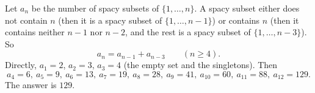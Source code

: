 Let $a_n$ be the number of spacy subsets of $\{1,\dots,n\}$. A spacy subset either does not contain $n$ (then it is a spacy subset of $\{1,\dots,n-1\}$) or contains $n$ (then it contains neither $n-1$ nor $n-2$, and the rest is a spacy subset of $\{1,\dots,n-3\}$). So
\[
a_n=a_{n-1}+a_{n-3}\qquad(n\ge4).
\]
Directly, $a_1=2$, $a_2=3$, $a_3=4$ (the empty set and the singletons). Then
\[
a_4=6,\ a_5=9,\ a_6=13,\ a_7=19,\ a_8=28,\ a_9=41,\ a_{10}=60,\ a_{11}=88,\ a_{12}=129 .
\]
The answer is $\boxed{129}$.
